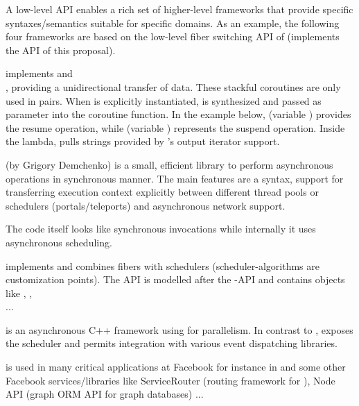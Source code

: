 
A low-level API enables a rich set of higher-level frameworks that provide
specific syntaxes/semantics suitable for specific domains. As an example, the
following four frameworks are based on the low-level fiber switching API of
\bcontext\cite{bcontext} (implements the API of this proposal).

\uabschnitt{\bcoroutine}\cite{bcoroutine2} implements 
 and\\
, providing a
unidirectional transfer of data. These stackful coroutines are only used in
pairs. When  is explicitly
instantiated,  is synthesized and passed as
parameter into the coroutine function. In the
example below,  (variable ) provides the
resume operation, while  (variable )
represents the suspend operation. Inside the lambda,
pulls strings provided by 's output iterator support.

\uabschnitt{\synca}\cite{synca} (by Grigory Demchenko) is a small, efficient
library to perform asynchronous operations in synchronous manner. The main
features are a  syntax, support for transferring execution context
explicitly between different thread pools or schedulers (portals/teleports) and
asynchronous network support.

The code itself looks like synchronous invocations while internally it uses
asynchronous scheduling.

\uabschnitt{\bfiber}\cite{bfiber} implements  and combines
fibers with schedulers (scheduler-algorithms are customization points). The API
is modelled after the \thread-API and contains objects like
, ,\\
 ...

\cite{fbfiber} is an asynchronous C++ framework
using  for parallelism. In contrast to \bfiber,
\fbfibers\xspace exposes the scheduler and permits integration with various
event dispatching libraries.

\fbfibers\xspace is used in many critical applications at Facebook for instance
in \fbmcrouter\cite{fbmcrouter} and some other Facebook services/libraries like
ServiceRouter (routing framework for \fbthrift\cite{fbthrift}), Node API (graph
ORM API for graph databases) ...\\

